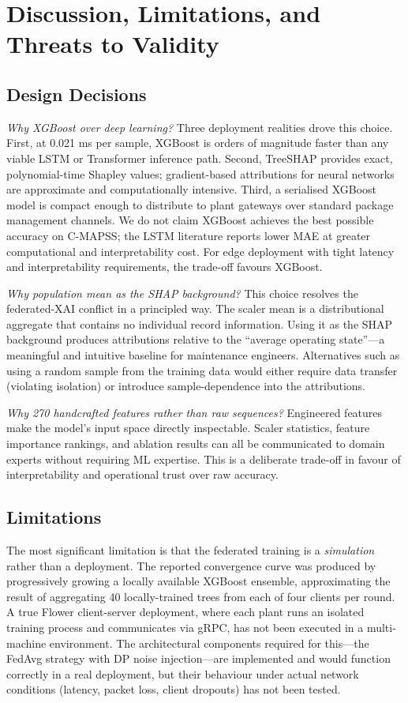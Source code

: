 \documentclass[10pt, journal, letterpaper]{IEEEtran}
\begin{document}
\section{Discussion, Limitations, and Threats to Validity}
\label{sec:discussion}

\subsection{Design Decisions}

\textit{Why XGBoost over deep learning?} Three deployment realities drove this
choice. First, at 0.021 ms per sample, XGBoost is orders of magnitude faster
than any viable LSTM or Transformer inference path. Second, TreeSHAP provides
exact, polynomial-time Shapley values; gradient-based attributions for neural
networks are approximate and computationally intensive. Third, a serialised
XGBoost model is compact enough to distribute to plant gateways over standard
package management channels. We do not claim XGBoost achieves the best
possible accuracy on C-MAPSS; the LSTM literature reports lower MAE at greater
computational and interpretability cost. For edge deployment with tight latency
and interpretability requirements, the trade-off favours XGBoost.

\textit{Why population mean as the SHAP background?} This choice resolves the
federated-XAI conflict in a principled way. The scaler mean is a distributional
aggregate that contains no individual record information. Using it as the SHAP
background produces attributions relative to the ``average operating state''—a
meaningful and intuitive baseline for maintenance engineers. Alternatives such
as using a random sample from the training data would either require data
transfer (violating isolation) or introduce sample-dependence into the
attributions.

\textit{Why 270 handcrafted features rather than raw sequences?} Engineered
features make the model's input space directly inspectable. Scaler statistics,
feature importance rankings, and ablation results can all be communicated to
domain experts without requiring ML expertise. This is a deliberate trade-off
in favour of interpretability and operational trust over raw accuracy.

\subsection{Limitations}

The most significant limitation is that the federated training is a
\emph{simulation} rather than a deployment. The reported convergence curve was
produced by progressively growing a locally available XGBoost ensemble,
approximating the result of aggregating 40 locally-trained trees from each of
four clients per round. A true Flower client-server deployment, where each
plant runs an isolated training process and communicates via gRPC, has not
been executed in a multi-machine environment. The architectural components
required for this—the FedAvg strategy with DP noise injection—are implemented
and would function correctly in a real deployment, but their behaviour under
actual network conditions (latency, packet loss, client dropouts) has not been
tested.
\end{document}

